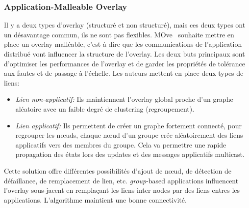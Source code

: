 		\subsubsection{Application-Malleable Overlay}
			Il y a deux types d'overlay (structuré et non structuré), mais ces deux types ont un désavantage commun, ils ne sont pas flexibles. MOve~\cite{10.1109/SRDS.2006.33} souhaite mettre en place un overlay malléable, c'est à dire que les communications de l'application distribué vont influencer la structure de l'overlay. Les deux buts principaux sont d'optimiser les performances de l'overlay et de garder les propriétés de tolérance aux fautes et de passage à l'échelle. Les auteurs mettent en place deux types de liens:
		\begin{itemize}
	        \renewcommand{\labelitemi}{$\bullet$}
	                \item \textit{Lien non-applicatif:} Ils maintiennent l'overlay global proche d'un graphe aléatoire avec un faible degré de clustering (regroupement).
        	        \item \textit{Lien applicatif:} Ils  permettent de créer un graphe fortement connecté, pour regrouper les nœuds, chaque nœud d'un groupe crée aléatoirement des liens applicatifs vers des membres du groupe. Cela va permettre une rapide propagation des états lors des updates et des messages applicatifs multicast.
        	\end{itemize}
        Cette solution offre différentes possibilités d'ajout de nœud, de détection de défaillance, de remplacement de lien, etc. \textit{group}-based applications influencent l'overlay sous-jacent en remplaçant les liens inter nodes par des liens entres les applications. L'algorithme maintient une bonne connectivité.
